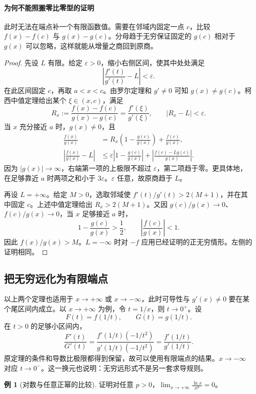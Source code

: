 \documentclass[UTF8,fontset=fandol,12pt,oneside,openany]{ctexrep}
\theoremstyle{definition}
\newtheorem{example}{例}[chapter]
\begin{document}
\paragraph{为何不能照搬零比零型的证明}
此时无法在端点补一个有限函数值。需要在邻域内固定一点 $c$，比较 $f(x)-f(c)$ 与 $g(x)-g(c)$。分母趋于无穷保证固定的 $g(c)$ 相对于 $g(x)$ 可以忽略，这样就能从增量之商回到原商。

\begin{proof}
先设 $L$ 有限。给定 $\varepsilon>0$，缩小右侧区间，使其中处处满足
\[
\left|\frac{f'(t)}{g'(t)}-L\right|<\varepsilon.
\]
在此区间固定 $c$，再取 $a<x<c$。由罗尔定理和 $g'\ne0$ 可知 $g(x)\ne g(c)$。柯西中值定理给出某个 $\xi\in(x,c)$，满足
\[
R_x:=\frac{f(x)-f(c)}{g(x)-g(c)}
=\frac{f'(\xi)}{g'(\xi)},\qquad |R_x-L|<\varepsilon.
\]
当 $x$ 充分接近 $a$ 时，$g(x)\ne0$，且
\begin{align*}
\frac{f(x)}{g(x)}
&=R_x\left(1-\frac{g(c)}{g(x)}\right)+\frac{f(c)}{g(x)},\\
\left|\frac{f(x)}{g(x)}-L\right|
&\le\varepsilon\left|1-\frac{g(c)}{g(x)}\right|
+\left|\frac{f(c)-Lg(c)}{g(x)}\right|.
\end{align*}
因为 $|g(x)|\to\infty$，右端第一项的上极限不超过 $\varepsilon$，第二项趋于零。更具体地，在足够靠近 $a$ 时两项之和小于 $3\varepsilon$。$\varepsilon$ 任意，故原商趋于 $L$。

再设 $L=+\infty$。给定 $M>0$，选取邻域使 $f'(t)/g'(t)>2(M+1)$，并在其中固定 $c$。上述中值定理给出 $R_x>2(M+1)$。又因 $g(c)/g(x)\to0$、$f(c)/g(x)\to0$，当 $x$ 足够接近 $a$ 时，
\[
1-\frac{g(c)}{g(x)}>\frac12,
\qquad \left|\frac{f(c)}{g(x)}\right|<1.
\]
因此 $f(x)/g(x)>M$。$L=-\infty$ 时对 $-f$ 应用已经证明的正无穷情形。左侧的证明相同。
\end{proof}

\subsection{把无穷远化为有限端点}

以上两个定理也适用于 $x\to+\infty$ 或 $x\to-\infty$，此时可导性与 $g'(x)\ne0$ 要在某个尾区间内成立。以 $x\to+\infty$ 为例，令 $t=1/x$，则 $t\to0^+$。设
\[
F(t)=f(1/t),\qquad G(t)=g(1/t).
\]
在 $t>0$ 的足够小区间内，
\[
\frac{F'(t)}{G'(t)}
=\frac{f'(1/t)(-1/t^2)}{g'(1/t)(-1/t^2)}
=\frac{f'(1/t)}{g'(1/t)}.
\]
原定理的条件和导数比极限都得到保留，故可以使用有限端点的结果。$x\to-\infty$ 对应 $t\to0^-$。这一换元也说明：无穷远形式不是另一套求导规则。

\begin{example}[对数与任意正幂的比较]
证明对任意 $p>0$，$\displaystyle\lim_{x\to+\infty}\frac{\ln x}{x^p}=0$。
\end{example}
\end{document}
